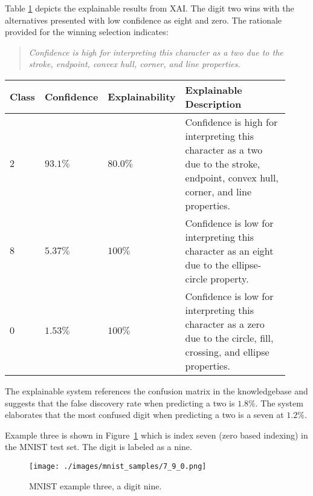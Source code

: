 Table \ref{table:mnist_example2_explanation} depicts the explainable results
from XAI. The digit two wins with the alternatives presented with low confidence
as eight and zero.  The rationale provided for the winning selection indicates:

\begin{quote}
    \textit{Confidence is high for interpreting this character as a two due to the stroke, endpoint, convex hull, corner, and line properties.}
\end{quote}

\begin{table}[H]
    \renewcommand{\arraystretch}{1.3}
     \label{table:mnist_example2_explanation}
    \begin{tabular}{| m{0.06\linewidth} | m{0.14\linewidth} | m{0.17\linewidth} | m{0.55\linewidth} |}
    \hline
     Class & Confidence & Explainability & Explainable Description \\
    \hline \hline
    $2$ & $93.1\%$ & $80.0\%$ & Confidence is high for interpreting this character as a two due to the stroke, endpoint, convex hull, corner, and line properties. \\ 
    \hline
    $8$ & $5.37\%$ & $100\%$ & Confidence is low for interpreting this character as an eight due to the ellipse-circle property. \\
    \hline
    $0$ & $1.53\%$ & $100\%$ & Confidence is low for interpreting this character as a zero due to the circle, fill, crossing, and ellipse properties. \\
    \hline
    \end{tabular}
\end{table}

The explainable system references the confusion matrix in the knowledgebase and
suggests that the false discovery rate when predicting a two is $1.8\%$. The
system elaborates that the most confused digit when predicting a two is a seven
at $1.2\%$.

Example three is shown in Figure~\ref{fig:mnist_example3} which is index seven (zero
based indexing) in the MNIST test set. The digit is labeled as a nine.

\begin{figure}[H]
    \centerline{\texttt{[image: ./images/mnist\_samples/7\_9\_0.png]}}
    \caption{MNIST example three, a digit nine.}
    \label{fig:mnist_example3}
\end{figure}

